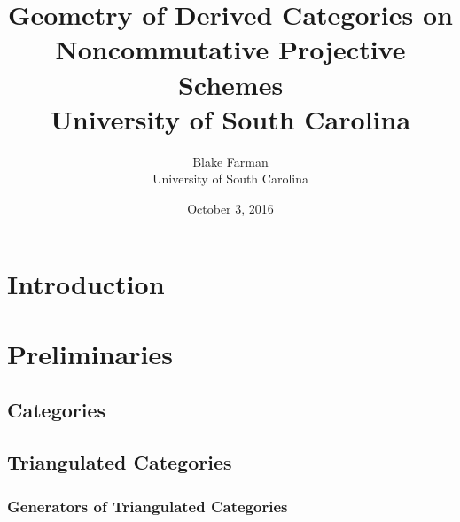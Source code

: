\documentclass[10pt,draft]{book}
\author{Blake Farman\\University of South Carolina}
\title{
  {Geometry of Derived Categories on Noncommutative Projective Schemes}\\
  {University of South Carolina}
}
\date{October 3, 2016}
\begin{document}
\maketitle

\tableofcontents

\newtheorem{thm}{Theorem}[section]
\newtheorem{lem}[thm]{Lemma}
\newtheorem{cor}[thm]{Corollary}
\newtheorem{prop}[thm]{Proposition}

\theoremstyle{definition}
\newtheorem{defn}[thm]{Definition}
\newtheorem{rmk}[thm]{Remark}
\newtheorem{eg}[thm]{Example}

\chapter{Introduction}
\chapter{Preliminaries}
\section{Categories}
%
%
%
%
%
%
\section{Triangulated Categories}

%
\subsection{Generators of Triangulated Categories}

%
%
\end{document}
